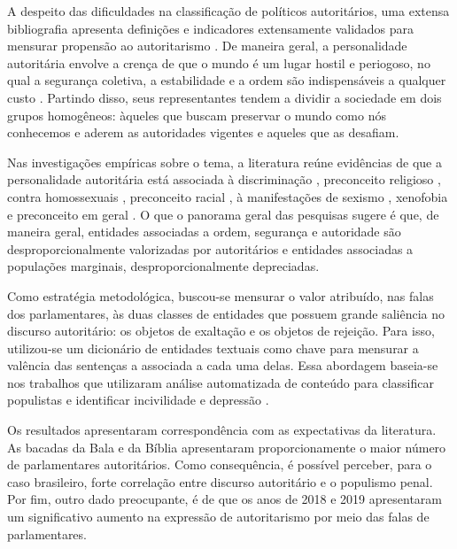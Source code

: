 \documentclass[
12pt,				%
openright,			%
twoside,			%
a4paper,			%
english,			%
french,				%
spanish,			%
brazil				%
]{abntex2}
\begin{document}
A despeito das dificuldades na classificação de políticos autoritários, uma extensa bibliografia apresenta definições e indicadores extensamente validados para mensurar propensão ao autoritarismo \cite{titus1957california, meloen1993f}. De maneira geral, a personalidade autoritária envolve a crença de que o mundo é um lugar hostil e periogoso, no qual a segurança coletiva, a estabilidade e a ordem são indispensáveis a qualquer custo \cite{altemeyer1996authoritarian}. Partindo disso, seus representantes tendem a dividir a sociedade em dois grupos homogêneos: àqueles que buscam preservar o mundo como nós conhecemos e aderem as autoridades vigentes e aqueles que as desafiam.

Nas investigações empíricas sobre o tema, a literatura reúne evidências de que a personalidade autoritária está associada à discriminação \cite{titus1957california, meloen1993f}, preconceito religioso \cite{laythe2001predicting}, contra homossexuais \cite{hunsberger1996religious, jonathan2008influence}, preconceito racial \cite{rowatt2004christian}, à manifestações de sexismo \cite{sibley2007antecedents}, xenofobia \cite{thomsen2008we} e preconceito em geral \cite{asbrock2010right}. O que o panorama geral das pesquisas sugere é que, de maneira geral, entidades associadas a ordem, segurança e autoridade são desproporcionalmente valorizadas por autoritários e entidades associadas a populações marginais, desproporcionalmente depreciadas.

Como estratégia metodológica, buscou-se mensurar o valor atribuído, nas falas dos parlamentares, às duas classes de entidades que possuem grande saliência no discurso autoritário: os objetos de exaltação e os objetos de rejeição. Para isso, utilizou-se um dicionário de entidades textuais como chave para mensurar a valência das sentenças a associada a cada uma delas. Essa abordagem baseia-se nos trabalhos que utilizaram análise automatizada de conteúdo para classificar populistas \cite{rooduijn2011measuring, oliver2016rise, aslanidis2018measuring} e identificar incivilidade \cite{vargo2017socioeconomic} e depressão \cite{neuman2012proactive, kang2016identifying}.

Os resultados apresentaram correspondência com as expectativas da literatura. As bacadas da Bala e da Bíblia apresentaram proporcionamente o maior número de parlamentares autoritários. Como consequência, é possível perceber, para o caso brasileiro, forte correlação entre discurso autoritário e o populismo penal. Por fim, outro dado preocupante, é de que os anos de 2018 e 2019 apresentaram um significativo aumento na expressão de autoritarismo por meio das falas de parlamentares.
\end{document}
